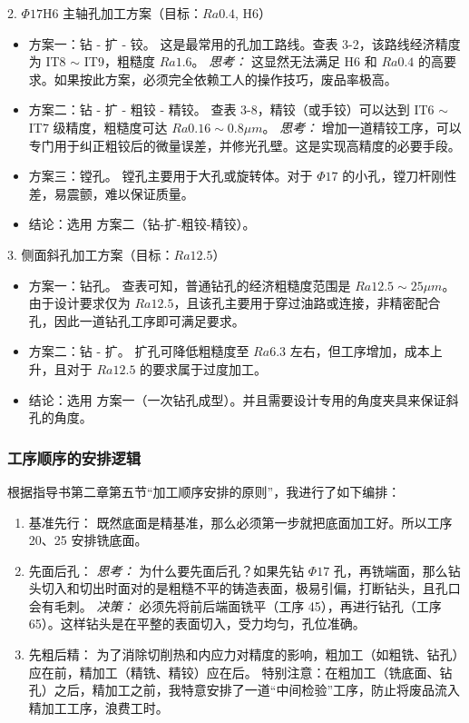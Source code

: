 \documentclass[withoutpreface,bwprint]{cumcmthesis}
\begin{document}
2. $\Phi17$H6 主轴孔加工方案（目标：$Ra 0.4$, H6）
\begin{itemize}
    \item 方案一：钻 - 扩 - 铰。
    这是最常用的孔加工路线。查表 3-2，该路线经济精度为 IT8 $\sim$ IT9，粗糙度 $Ra 1.6$。
    \textit{思考：} 这显然无法满足 H6 和 $Ra 0.4$ 的高要求。如果按此方案，必须完全依赖工人的操作技巧，废品率极高。
    \item 方案二：钻 - 扩 - 粗铰 - 精铰。
    查表 3-8，精铰（或手铰）可以达到 IT6 $\sim$ IT7 级精度，粗糙度可达 $Ra 0.16 \sim 0.8 \mu m$。
    \textit{思考：} 增加一道精铰工序，可以专门用于纠正粗铰后的微量误差，并修光孔壁。这是实现高精度的必要手段。
    \item 方案三：镗孔。
    镗孔主要用于大孔或旋转体。对于 $\Phi17$ 的小孔，镗刀杆刚性差，易震颤，难以保证质量。
    \item 结论：选用 方案二（钻-扩-粗铰-精铰）。
\end{itemize}

3. 侧面斜孔加工方案（目标：$Ra 12.5$）
\begin{itemize}
    \item 方案一：钻孔。
    查表可知，普通钻孔的经济粗糙度范围是 $Ra 12.5 \sim 25 \mu m$。由于设计要求仅为 $Ra 12.5$，且该孔主要用于穿过油路或连接，非精密配合孔，因此一道钻孔工序即可满足要求。
    \item 方案二：钻 - 扩。
    扩孔可降低粗糙度至 $Ra 6.3$ 左右，但工序增加，成本上升，且对于 $Ra 12.5$ 的要求属于过度加工。
    \item 结论：选用 方案一（一次钻孔成型）。并且需要设计专用的角度夹具来保证斜孔的角度。
\end{itemize}




\subsubsection{工序顺序的安排逻辑}
根据指导书第二章第五节“加工顺序安排的原则”，我进行了如下编排：
\begin{enumerate}
    \item 基准先行：
    既然底面是精基准，那么必须第一步就把底面加工好。所以工序 20、25 安排铣底面。
    \item 先面后孔：
    \textit{思考：} 为什么要先面后孔？如果先钻 $\Phi17$ 孔，再铣端面，那么钻头切入和切出时面对的是粗糙不平的铸造表面，极易引偏，打断钻头，且孔口会有毛刺。
    \textit{决策：} 必须先将前后端面铣平（工序 45），再进行钻孔（工序 65）。这样钻头是在平整的表面切入，受力均匀，孔位准确。
    \item 先粗后精：
    为了消除切削热和内应力对精度的影响，粗加工（如粗铣、钻孔）应在前，精加工（精铣、精铰）应在后。
    特别注意：在粗加工（铣底面、钻孔）之后，精加工之前，我特意安排了一道“中间检验”工序，防止将废品流入精加工工序，浪费工时。
\end{enumerate}
\end{document}
